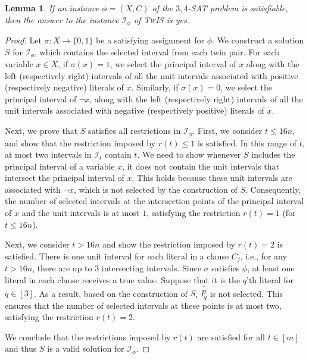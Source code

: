 \documentclass[letterpaper,11pt]{article}
\newtheorem{lemma}[theorem]{Lemma}
\newcommand{\sssattt}{\textsc{$3,4$-SAT}\xspace}
\newcommand{\tis}{\textsc{TwIS}\xspace}
\begin{document}
\begin{lemma} \label{lemma1_SATtoTIS}
If an instance $\phi=(X,C)$ of the \sssattt problem is satisfiable, then the answer to the instance $\mathcal{I}_\phi$ of \tis is yes.
\end{lemma}

\begin{proof}
Let $\sigma: X \to \{0, 1\}$ be a satisfying assignment for $\phi$. We construct a solution $S$ for $\mathcal{I}_\phi$, which contains the selected interval from each twin pair. For each variable $x \in X$, if $\sigma(x) = 1$, we select the principal interval of $x$ along with the left (respectively right) intervals of all the unit intervals associated with positive (respectively negative) literals of $x$. 
Similarly, if $\sigma(x) = 0$, we select the principal interval of $\neg x$, along with the left (respectively right) intervals of all the unit intervals associated with negative (respectively positive) literals of $x$.


Next, we prove that $S$ satisfies all restrictions in $\mathcal{I}_\phi$. 
First, we consider $t\leq 16n$, and show that the restriction imposed by $r(t)\leq 1$ is satisfied. In this range of $t$, at most two intervals in $\mathcal{I}_t$ contain $t$. 
We need to show whenever $S$ includes the principal interval of a variable $x$, it does not contain the unit intervals that intersect the principal interval of $x$. 
This holds because these unit intervals are associated with $\neg x$, which is not selected by the construction of $S$.
Consequently, the number of selected intervals at the intersection points of the principal interval of $x$ and the unit intervals is at most $1$, satisfying the restriction $r(t) = 1$ (for $t \leq 16n$).

Next, we consider $t>16n$ and show the restriction imposed by $r(t) = 2$ is satisfied. There is one unit interval for each literal in a clause $C_j$, i.e., for any $t>16n$, there are up to 3 intersecting intervals. Since $\sigma$ satisfies $\phi$, at least one literal in each clause receives a true value. 
Suppose that it is the $q$'th literal for $q\in [3]$. 
As a result, based on the construction of $S$, $\overline{I^j_q}$ is not selected. This ensures that the number of selected intervals at these points is at most two, satisfying the restriction $r(t) =2$. 

We conclude that the restrictions imposed by $r(t)$ are satisfied for all $t\in[m]$ and thus $S$ is a valid solution for $\mathcal{I}_\phi$.
\end{proof}
\end{document}
